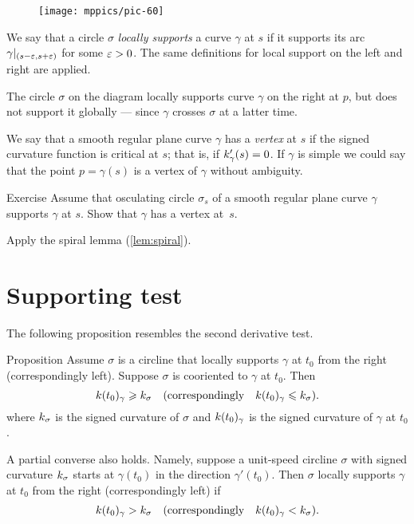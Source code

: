 \begin{wrapfigure}{O}{43 mm}
\vskip0mm
\centering
\texttt{[image: mppics/pic-60]}
\vskip0mm
\end{wrapfigure}

We say that a circle $\sigma$ \emph{locally supports} a curve $\gamma$ at $s$
if it supports its arc $\gamma|_{(s-\varepsilon,s+\varepsilon)}$ for some $\varepsilon>0$.
The same definitions for local support on the left and right are applied.

The circle $\sigma$ on the diagram locally supports curve $\gamma$ on the right at $p$, but does not support it globally --- since $\gamma$ crosses $\sigma$ at a latter time.


We say that a smooth regular plane curve $\gamma$ has a \emph{vertex} at $s$
if the signed curvature function is critical at $s$;
that is, if $k'_\gamma(s)=0$.
If $\gamma$ is simple we could say that the point $p=\gamma(s)$ is a vertex of $\gamma$ without ambiguity.

\begin{thm}{Exercise}\label{ex:vertex-support}
Assume that osculating circle $\sigma_s$ of a smooth regular plane curve $\gamma$ supports $\gamma$ at $s$.
Show that $\gamma$ has a vertex at~$s$.
\end{thm}

 Apply the spiral lemma (\ref{lem:spiral}).

\section*{Supporting test}

The following proposition resembles the second derivative test. 

\begin{thm}{Proposition}\label{prop:supporting-circline}
Assume $\sigma$ is a circline that locally supports $\gamma$ at $t_0$ from the right (correspondingly left). 
Suppose $\sigma$ is cooriented to $\gamma$ at $t_0$.
Then 
\[k(t_0)_\gamma\geqslant k_\sigma
\quad(\text{correspondingly}\quad k(t_0)_\gamma\leqslant k_\sigma).
\] 
where $k_\sigma$ is the signed curvature of $\sigma$ 
and $k(t_0)_\gamma$ is the signed curvature of $\gamma$ at $t_0$.

A partial converse also holds.
Namely, suppose a unit-speed circline $\sigma$ with signed curvature $k_\sigma$ starts at $\gamma(t_0)$ in the direction $\gamma'(t_0)$.
Then $\sigma$ locally supports $\gamma$ at $t_0$ from the right (correspondingly left) if 
\[k(t_0)_\gamma> k_\sigma
\quad(\text{correspondingly}\quad k(t_0)_\gamma< k_\sigma).
\]

\end{thm}

